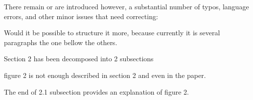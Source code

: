 \documentclass[10pt]{article}
\begin{document}
\begin{response}{There remain or are introduced however, a substantial number of typos, language errors, and other minor issues that need correcting:}

\end{response}


\begin{response}{Would it be possible to structure it more, because currently it is several paragraphs the one bellow the others.}

Section 2 has been decomposed into 2 subsections

\end{response}


\begin{response}{figure 2 is not enough described in section 2 and even in the paper.}

The end of 2.1 subsection provides an explanation of figure 2.

\end{response}
\end{document}
